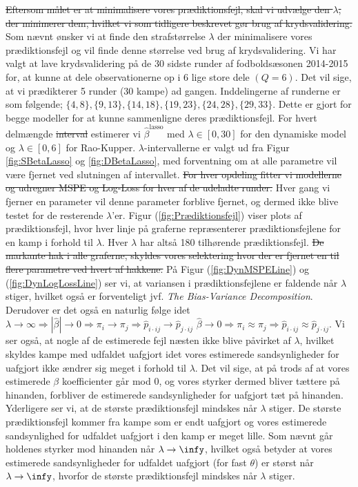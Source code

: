 \documentclass[11pt,a4paper]{article}
\begin{document}
\par \sout{ Eftersom målet er at minimalisere vores prædiktionsfejl, skal vi udvælge den $\lambda$, der minimerer dem, hvilket vi som tidligere beskrevet gør brug af krydsvalidering.} Som nævnt ønsker vi at finde den strafstørrelse $\lambda$ der minimalisere vores prædiktionsfejl og vil finde denne størrelse ved brug af krydsvalidering. Vi har valgt at lave krydsvalidering på de 30 sidste runder af fodboldsæsonen 2014-2015 for, at kunne at dele observationerne op i 6 lige store dele $(Q=6)$. Det vil sige, at vi prædikterer 5 runder (30 kampe) ad gangen. Inddelingerne af runderne er som følgende; $\{4,8\},\{9,13\},\{14,18\},\{19,23\},\{24,28\},\{29,33\}$. Dette er gjort for begge modeller for at kunne sammenligne deres prædiktionsfejl. For hvert delmængde \sout{interval} estimerer vi $\hat{\beta}^{\text{lasso}}$ med $\lambda \in [0,30]$ for den dynamiske model og $\lambda \in [0,6]$ for Rao-Kupper. $\lambda$-intervallerne er valgt ud fra Figur \ref{fig:SBetaLasso} og \ref{fig:DBetaLasso}, med forventning om at alle parametre vil være fjernet ved slutningen af intervallet. \sout{For hver opdeling fitter vi modellerne og udregner MSPE og Log-Loss for hver af de udeladte runder.} Hver gang vi fjerner en parameter vil denne parameter forblive fjernet, og dermed ikke blive testet for de resterende $\lambda$'er. Figur (\ref{fig:Prædiktionsfejl}) viser plots af prædiktionsfejl, hvor hver linje på graferne repræsenterer prædiktionsfejlene for en kamp i forhold til $\lambda$. Hver $\lambda$ har altså 180 tilhørende prædiktionsfejl. \sout{De markante hak i alle graferne, skyldes vores selektering hvor der er fjernet en til flere parametre ved hvert af hakkene.} På Figur (\ref{fig:DynMSPELine}) og (\ref{fig:DynLogLossLine}) ser vi, at variansen i prædiktionsfejlene er faldende når $\lambda$ stiger, hvilket også er forventeligt jvf. \textit{The Bias-Variance Decomposition}. Derudover er det også en naturlig følge idet $\lambda \rightarrow \infty \Rightarrow |\hat{\beta}| \rightarrow 0 \Rightarrow \pi_i \rightarrow \pi_j \Rightarrow \hat{p}_{i\cdot ij} \rightarrow \hat{p}_{j \cdot ij}$ \sout{$\hat{\beta} \rightarrow 0 \Rightarrow \pi_i \approx \pi_j \Rightarrow \hat{p}_{i\cdot ij} \approx \hat{p}_{j \cdot ij}$}. Vi ser også, at nogle af de estimerede fejl næsten ikke blive påvirket af $\lambda$, hvilket skyldes kampe med udfaldet uafgjort idet vores estimerede sandsynligheder for uafgjort ikke ændrer sig  meget i forhold til $\lambda$. Det vil sige, at på trods af at vores estimerede $\beta$ koefficienter går mod $0$, og vores styrker dermed bliver tættere på hinanden, forbliver de estimerede sandsynligheder for uafgjort tæt på hinanden. Yderligere ser vi, at de største prædiktionsfejl mindskes når $\lambda$ stiger. De største prædiktionsfejl kommer fra kampe som er endt uafgjort og vores estimerede sandsynlighed for udfaldet uafgjort i den kamp er meget lille. Som nævnt går holdenes styrker mod hinanden når $\lambda \rightarrow \infy$, hvilket også betyder at vores estimerede sandsynligheder for udfaldet uafgjort (for fast $\theta$) er størst når $\lambda \rightarrow \infy$, hvorfor de største prædiktionsfejl mindskes når $\lambda$ stiger.\par
\end{document}
